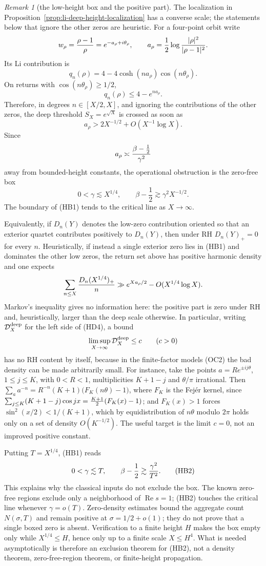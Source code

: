 \documentclass[11pt]{amsart}
\theoremstyle{definition}
\theoremstyle{remark}
\newtheorem{remark}[theorem]{Remark}
\theoremstyle{definition}
\renewcommand{\Re}{\operatorname{Re}}
\begin{document}
\begin{remark}[the low-height box and the positive part]
\label{rmk:deep-height-box-markov}
The localization in Proposition~\ref{prop:li-deep-height-localization}
has a converse scale; the statements below that ignore the other zeros are
heuristic.  For a four-point orbit write
\[
 w_\rho={\rho-1\over\rho}=e^{-a_\rho+i\theta_\rho},
 \qquad
 a_\rho={1\over2}\log {|\rho|^2\over|\rho-1|^2}.
\]
Its Li contribution is
\[
 q_n(\rho)=4-4\cosh(na_\rho)\cos(n\theta_\rho).
\]
On returns with $\cos(n\theta_\rho)\ge1/2$,
\[
 q_n(\rho)\le4-e^{na_\rho}.
\]
Therefore, in degrees $n\in[X/2,X]$, and ignoring the contributions of
the other zeros, the deep threshold $S_X=e^{\sqrt X}$ is crossed as soon as
\[
 a_\rho>2X^{-1/2}+O(X^{-1}\log X).
\]
Since
\[
 a_\rho\asymp{\beta-\frac12\over\gamma^2}
\]
away from bounded-height constants, the operational obstruction is the
zero-free box
\[
 0<\gamma\lesssim X^{1/4},
 \qquad
 \beta-\frac12\gtrsim \gamma^2X^{-1/2}.                  \tag{HB1}
\]
The boundary of (HB1) tends to the critical line as $X\to\infty$.

Equivalently, if $D_n(Y)$ denotes the low-zero contribution oriented so
that an exterior quartet contributes positively to $D_n(Y)$, then under RH
$D_n(Y)_+=0$ for every $n$.  Heuristically, if instead a single exterior
zero lies in (HB1) and dominates the other low zeros, the return set above
has positive harmonic density and one expects
\[
 \sum_{n\le X}{D_n(X^{1/4})_+\over n}
 \gg e^{Xa_\rho/2}-O(X^{1/4}\log X).
\]
Markov's inequality gives no information here: the positive part is zero
under RH and, heuristically, larger than the deep scale otherwise.  In
particular, writing $\mathcal D^{\rm deep}_X$ for the left side of (HD4), a bound
\[
 \limsup_{X\to\infty}\mathcal D^{\rm deep}_X\le c
 \qquad(c>0)
\]
has no RH content by itself, because in the finite-factor models (OC2)
the bad density can be made arbitrarily small.  For instance, take the
points $a=Re^{\pm ij\theta}$, $1\le j\le K$, with $0<R<1$, multiplicities
$K+1-j$ and $\theta/\pi$ irrational.  Then
$\sum_a a^{-n}=R^{-n}(K+1)\bigl(F_K(n\theta)-1\bigr)$, where $F_K$ is the
Fej\'er kernel, since $\sum_{j\le K}(K+1-j)\cos jx={K+1\over2}(F_K(x)-1)$;
and $F_K(x)>1$ forces $\sin^2(x/2)<1/(K+1)$, which by equidistribution of
$n\theta$ modulo $2\pi$ holds only on a set of density $O(K^{-1/2})$.  The useful target is the limit $c=0$, not an
improved positive constant.

Putting $T=X^{1/4}$, (HB1) reads
\[
 0<\gamma\lesssim T,\qquad
 \beta-\frac12\gtrsim{\gamma^2\over T^2}.                \tag{HB2}
\]
This explains why the classical inputs do not exclude the box.  The known
zero-free regions exclude only a neighborhood of $\Re s=1$; (HB2) touches
the critical line whenever $\gamma=o(T)$.  Zero-density estimates bound
the aggregate count $N(\sigma,T)$ and remain positive at
$\sigma=1/2+o(1)$; they do not prove that a single boxed zero is absent.
Verification to a finite height $H$ makes the box empty only while
$X^{1/4}\le H$, hence only up to a finite scale $X\le H^4$.  What is
needed asymptotically is therefore an exclusion theorem for (HB2), not a density theorem,
zero-free-region theorem, or finite-height propagation.


\end{remark}
\end{document}
